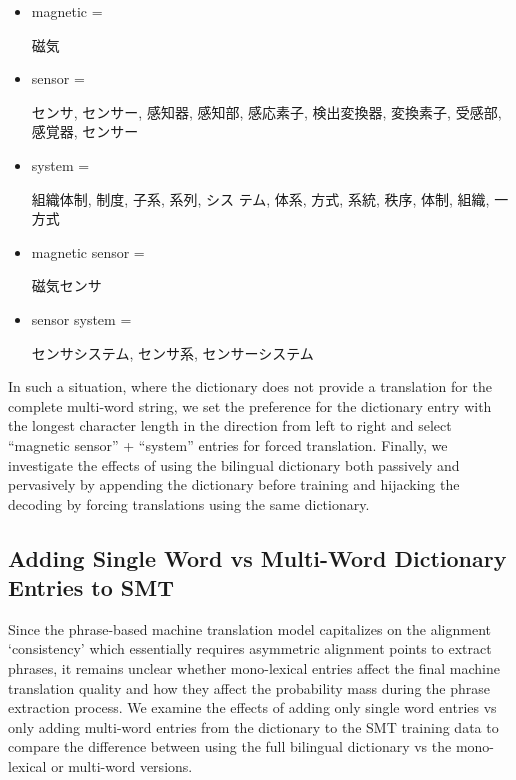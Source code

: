 \begin{itemize}[noitemsep]
\item  magnetic = \begin{CJK*}{UTF8}{min}磁気\end{CJK*}
\item sensor = \begin{CJK*}{UTF8}{min}センサ, センサー, 感知器, 感知部, 感応素子, 検出変換器, 変換素子, 受感部, 感覚器, センサー\end{CJK*}
\item system = \begin{CJK*}{UTF8}{min}組織体制, 制度, 子系, 系列, シス
テム, 体系, 方式, 系統, 秩序, 体制, 組織,
一方式\end{CJK*}
\item  magnetic sensor = \begin{CJK*}{UTF8}{min}磁気センサ\end{CJK*}
\item  sensor system = \begin{CJK*}{UTF8}{min}センサシステム, センサ系, センサーシステム\end{CJK*}
\end{itemize}

In such a situation, where the dictionary does not provide a translation for the complete multi-word string, we set the preference for the dictionary entry with the longest character length in the direction from left to right and select “magnetic sensor” + “system” entries for forced translation. Finally, we investigate the effects of using the bilingual dictionary both passively and pervasively by appending the dictionary before training and hijacking the decoding by forcing translations using the same dictionary.

\subsection{Adding Single Word vs Multi-Word Dictionary Entries to SMT}

Since the phrase-based machine translation model capitalizes on the alignment `consistency’ which essentially requires asymmetric alignment points to extract phrases, it remains unclear whether mono-lexical entries affect the final machine translation quality and how they affect the probability mass during the phrase extraction process. We examine the effects of adding only single word entries vs only adding multi-word entries from the dictionary to the SMT training data to compare the difference between using the full bilingual dictionary vs the mono-lexical or multi-word versions.

